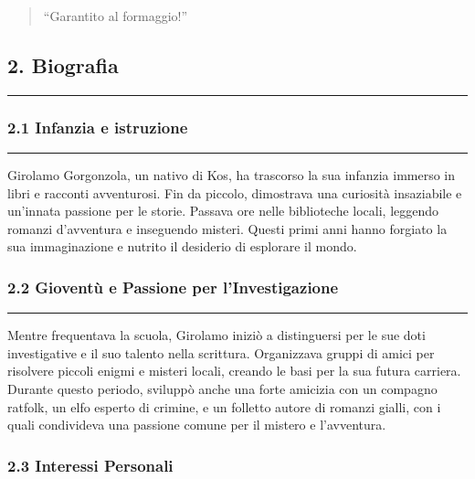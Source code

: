 \begin{quote}
``Garantito al formaggio!''
\end{quote}

\subsection{2. Biografia}\label{biografia}

\begin{center}\rule{0.5\linewidth}{0.5pt}\end{center}

\subsubsection{2.1 Infanzia e istruzione}\label{infanzia-e-istruzione}

\begin{center}\rule{0.5\linewidth}{0.5pt}\end{center}

Girolamo Gorgonzola, un nativo di Kos, ha trascorso la sua infanzia
immerso in libri e racconti avventurosi. Fin da piccolo, dimostrava una
curiosità insaziabile e un'innata passione per le storie. Passava ore
nelle biblioteche locali, leggendo romanzi d'avventura e inseguendo
misteri. Questi primi anni hanno forgiato la sua immaginazione e nutrito
il desiderio di esplorare il mondo.

\subsubsection{2.2 Gioventù e Passione per
l'Investigazione}\label{gioventuxf9-e-passione-per-linvestigazione}

\begin{center}\rule{0.5\linewidth}{0.5pt}\end{center}

Mentre frequentava la scuola, Girolamo iniziò a distinguersi per le sue
doti investigative e il suo talento nella scrittura. Organizzava gruppi
di amici per risolvere piccoli enigmi e misteri locali, creando le basi
per la sua futura carriera. Durante questo periodo, sviluppò anche una
forte amicizia con un compagno ratfolk, un elfo esperto di crimine, e un
folletto autore di romanzi gialli, con i quali condivideva una passione
comune per il mistero e l'avventura.

\subsubsection{2.3 Interessi Personali}\label{interessi-personali}

